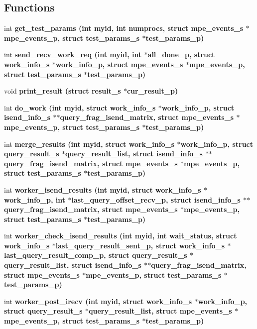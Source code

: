 \subsection*{Functions}
\begin{CompactItemize}
\item 
int \bf{get\_\-test\_\-params} (int myid, int numprocs, struct \bf{mpe\_\-events\_\-s} $\ast$mpe\_\-events\_\-p, struct \bf{test\_\-params\_\-s} $\ast$test\_\-params\_\-p)
\item 
int \bf{send\_\-recv\_\-work\_\-req} (int myid, int $\ast$all\_\-done\_\-p, struct \bf{work\_\-info\_\-s} $\ast$work\_\-info\_\-p, struct \bf{mpe\_\-events\_\-s} $\ast$mpe\_\-events\_\-p, struct \bf{test\_\-params\_\-s} $\ast$test\_\-params\_\-p)
\item 
void \bf{print\_\-result} (struct \bf{result\_\-s} $\ast$cur\_\-result\_\-p)
\item 
int \bf{do\_\-work} (int myid, struct \bf{work\_\-info\_\-s} $\ast$work\_\-info\_\-p, struct \bf{isend\_\-info\_\-s} $\ast$$\ast$query\_\-frag\_\-isend\_\-matrix, struct \bf{mpe\_\-events\_\-s} $\ast$mpe\_\-events\_\-p, struct \bf{test\_\-params\_\-s} $\ast$test\_\-params\_\-p)
\item 
int \bf{merge\_\-results} (int myid, struct \bf{work\_\-info\_\-s} $\ast$work\_\-info\_\-p, struct \bf{query\_\-result\_\-s} $\ast$query\_\-result\_\-list, struct \bf{isend\_\-info\_\-s} $\ast$$\ast$query\_\-frag\_\-isend\_\-matrix, struct \bf{mpe\_\-events\_\-s} $\ast$mpe\_\-events\_\-p, struct \bf{test\_\-params\_\-s} $\ast$test\_\-params\_\-p)
\item 
int \bf{worker\_\-isend\_\-results} (int myid, struct \bf{work\_\-info\_\-s} $\ast$work\_\-info\_\-p, int $\ast$last\_\-query\_\-offset\_\-recv\_\-p, struct \bf{isend\_\-info\_\-s} $\ast$$\ast$query\_\-frag\_\-isend\_\-matrix, struct \bf{mpe\_\-events\_\-s} $\ast$mpe\_\-events\_\-p, struct \bf{test\_\-params\_\-s} $\ast$test\_\-params\_\-p)
\item 
int \bf{worker\_\-check\_\-isend\_\-results} (int myid, int wait\_\-status, struct \bf{work\_\-info\_\-s} $\ast$last\_\-query\_\-result\_\-sent\_\-p, struct \bf{work\_\-info\_\-s} $\ast$last\_\-query\_\-result\_\-comp\_\-p, struct \bf{query\_\-result\_\-s} $\ast$query\_\-result\_\-list, struct \bf{isend\_\-info\_\-s} $\ast$$\ast$query\_\-frag\_\-isend\_\-matrix, struct \bf{mpe\_\-events\_\-s} $\ast$mpe\_\-events\_\-p, struct \bf{test\_\-params\_\-s} $\ast$test\_\-params\_\-p)
\item 
int \bf{worker\_\-post\_\-irecv} (int myid, struct \bf{work\_\-info\_\-s} $\ast$work\_\-info\_\-p, struct \bf{query\_\-result\_\-s} $\ast$query\_\-result\_\-list, struct \bf{mpe\_\-events\_\-s} $\ast$mpe\_\-events\_\-p, struct \bf{test\_\-params\_\-s} $\ast$test\_\-params\_\-p)

\end{CompactItemize}
